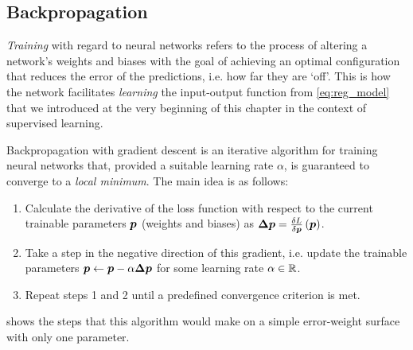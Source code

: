 \documentclass[../main.tex]{subfiles}
\begin{document}
\subsection{Backpropagation}
\emph{Training} with regard to neural networks refers to the process of altering a network's weights and biases with the goal of achieving an optimal configuration that reduces the error of the predictions, i.e. how far they are `off'. 
This is how the network facilitates \emph{learning} the input-output function from \cref{eq:reg_model} that we introduced at the very beginning of this chapter in the context of supervised learning.

Backpropagation with gradient descent is an iterative algorithm for training neural networks that, provided a suitable learning rate $\alpha$, is guaranteed to converge to a \emph{local minimum}.
The main idea is as follows:
\begin{enumerate}
    \item Calculate the derivative of the loss function with respect to the current trainable parameters ${\bm{p}}$ (weights and biases) as
        $\bm{\Delta p} = \frac{\delta L}{\delta {\bm{p}}}\left({\bm{p}}\right)$.
    \item Take a step in the negative direction of this gradient, i.e. update the trainable parameters ${\bm{p}} \leftarrow {\bm{p}} - \alpha \bm{\Delta p}$ for some learning rate $\alpha \in \mathbb{R}$.
    \item Repeat steps 1 and 2 until a predefined convergence criterion is met.
\end{enumerate}
 shows the steps that this algorithm would make on a simple error-weight surface with only one parameter.
\end{document}
